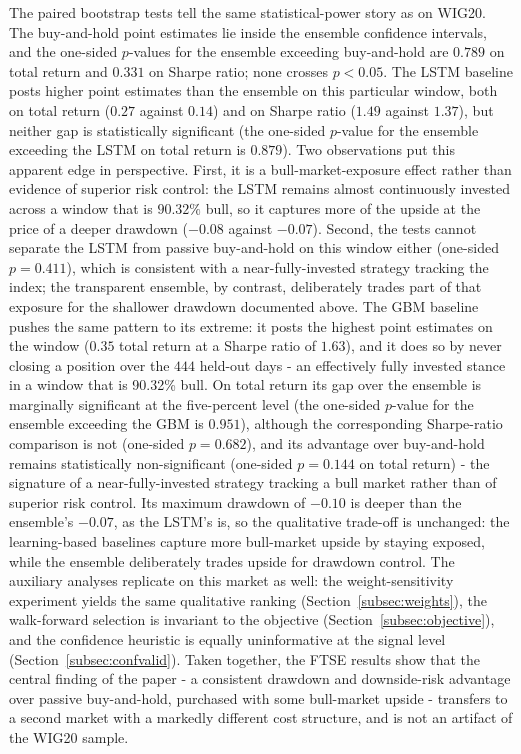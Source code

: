 \documentclass{ieeeaccess}
\newcommand{\FtseOOSDays}{\ensuremath{444}}
\newcommand{\FtseTRtest}{\ensuremath{0.14}}
\newcommand{\FtseMDD}{\ensuremath{-0.07}}
\newcommand{\FtseSharpe}{\ensuremath{1.37}}
\newcommand{\FtsePvsBH}{\ensuremath{0.789}}
\newcommand{\FtsePvsBHsharpe}{\ensuremath{0.331}}
\newcommand{\FtseRegBullShare}{90.32\%}
\newcommand{\FtseLSTMtest}{\ensuremath{0.27}}
\newcommand{\FtseLSTMsharpe}{\ensuremath{1.49}}
\newcommand{\FtseLSTMmdd}{\ensuremath{-0.08}}
\newcommand{\FtsePensVsLSTM}{\ensuremath{0.879}}
\newcommand{\FtsePLSTMvsBH}{\ensuremath{0.411}}
\newcommand{\FtseGBMtest}{\ensuremath{0.35}}
\newcommand{\FtseGBMsharpe}{\ensuremath{1.63}}
\newcommand{\FtseGBMmdd}{\ensuremath{-0.10}}
\newcommand{\FtsePensVsGBM}{\ensuremath{0.951}}
\newcommand{\FtsePensVsGBMsharpe}{\ensuremath{0.682}}
\newcommand{\FtsePGBMvsBH}{\ensuremath{0.144}}
\begin{document}
The paired bootstrap tests tell the same statistical-power story as on WIG20. The buy-and-hold point estimates lie inside the ensemble confidence intervals, and the one-sided $p$-values for the ensemble exceeding buy-and-hold are \FtsePvsBH{} on total return and \FtsePvsBHsharpe{} on Sharpe ratio; none crosses $p < 0.05$. The LSTM baseline posts higher point estimates than the ensemble on this particular window, both on total return (\FtseLSTMtest{} against \FtseTRtest{}) and on Sharpe ratio (\FtseLSTMsharpe{} against \FtseSharpe{}), but neither gap is statistically significant (the one-sided $p$-value for the ensemble exceeding the LSTM on total return is \FtsePensVsLSTM{}). Two observations put this apparent edge in perspective. First, it is a bull-market-exposure effect rather than evidence of superior risk control: the LSTM remains almost continuously invested across a window that is $\FtseRegBullShare{}$ bull, so it captures more of the upside at the price of a deeper drawdown (\FtseLSTMmdd{} against \FtseMDD{}). Second, the tests cannot separate the LSTM from passive buy-and-hold on this window either (one-sided $p = \FtsePLSTMvsBH{}$), which is consistent with a near-fully-invested strategy tracking the index; the transparent ensemble, by contrast, deliberately trades part of that exposure for the shallower drawdown documented above. The GBM baseline pushes the same pattern to its extreme: it posts the highest point estimates on the window (\FtseGBMtest{} total return at a Sharpe ratio of \FtseGBMsharpe{}), and it does so by never closing a position over the \FtseOOSDays{} held-out days - an effectively fully invested stance in a window that is \FtseRegBullShare{} bull. On total return its gap over the ensemble is marginally significant at the five-percent level (the one-sided $p$-value for the ensemble exceeding the GBM is \FtsePensVsGBM{}), although the corresponding Sharpe-ratio comparison is not (one-sided $p = \FtsePensVsGBMsharpe{}$), and its advantage over buy-and-hold remains statistically non-significant (one-sided $p = \FtsePGBMvsBH{}$ on total return) - the signature of a near-fully-invested strategy tracking a bull market rather than of superior risk control. Its maximum drawdown of \FtseGBMmdd{} is deeper than the ensemble's \FtseMDD{}, as the LSTM's is, so the qualitative trade-off is unchanged: the learning-based baselines capture more bull-market upside by staying exposed, while the ensemble deliberately trades upside for drawdown control. The auxiliary analyses replicate on this market as well: the weight-sensitivity experiment yields the same qualitative ranking (Section~\ref{subsec:weights}), the walk-forward selection is invariant to the objective (Section~\ref{subsec:objective}), and the confidence heuristic is equally uninformative at the signal level (Section~\ref{subsec:confvalid}). Taken together, the FTSE results show that the central finding of the paper - a consistent drawdown and downside-risk advantage over passive buy-and-hold, purchased with some bull-market upside - transfers to a second market with a markedly different cost structure, and is not an artifact of the WIG20 sample.
\end{document}

